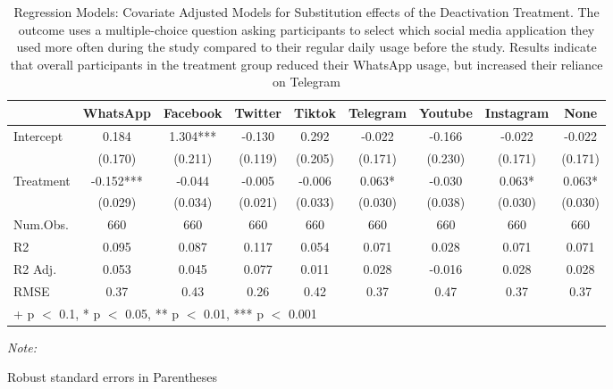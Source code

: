 \begin{table}

\caption{Regression Models: Covariate Adjusted Models for Substitution effects of the Deactivation Treatment. The outcome uses a multiple-choice question asking participants to select which social media application they used more often during the study compared to their regular daily usage before the study. Results indicate that overall participants in the treatment group reduced their WhatsApp usage, but increased their reliance on Telegram}
\centering
\begin{threeparttable}
\begin{tabular}[t]{lcccccccc}
\toprule
  & WhatsApp & Facebook & Twitter & Tiktok & Telegram & Youtube & Instagram & None\\
\midrule
Intercept & 0.184 & 1.304*** & -0.130 & 0.292 & -0.022 & -0.166 & -0.022 & -0.022\\
 & (0.170) & (0.211) & (0.119) & (0.205) & (0.171) & (0.230) & (0.171) & (0.171)\\
Treatment & -0.152*** & -0.044 & -0.005 & -0.006 & 0.063* & -0.030 & 0.063* & 0.063*\\
 & (0.029) & (0.034) & (0.021) & (0.033) & (0.030) & (0.038) & (0.030) & (0.030)\\
\midrule
Num.Obs. & 660 & 660 & 660 & 660 & 660 & 660 & 660 & 660\\
R2 & 0.095 & 0.087 & 0.117 & 0.054 & 0.071 & 0.028 & 0.071 & 0.071\\
R2 Adj. & 0.053 & 0.045 & 0.077 & 0.011 & 0.028 & -0.016 & 0.028 & 0.028\\
RMSE & 0.37 & 0.43 & 0.26 & 0.42 & 0.37 & 0.47 & 0.37 & 0.37\\
\bottomrule
\multicolumn{9}{l}{\rule{0pt}{1em}+ p $<$ 0.1, * p $<$ 0.05, ** p $<$ 0.01, *** p $<$ 0.001}\\
\end{tabular}
\begin{tablenotes}
\item \textit{Note: } 
\item Robust standard errors in Parentheses
\end{tablenotes}
\end{threeparttable}
\end{table}
